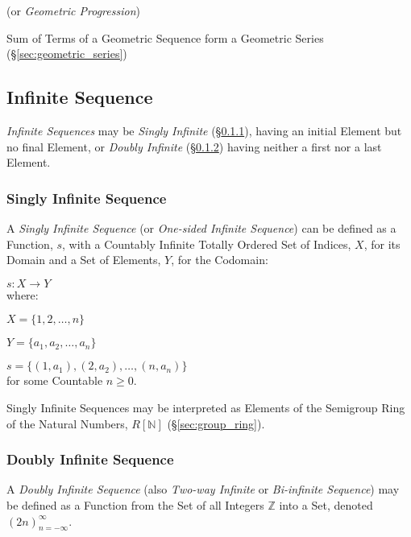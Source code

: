 (or \emph{Geometric Progression})

Sum of Terms of a Geometric Sequence form a Geometric Series
(\S\ref{sec:geometric_series})



\subsection{Infinite Sequence}\label{sec:infinite_sequence}

\emph{Infinite Sequences} may be \emph{Singly Infinite}
(\S\ref{sec:singly_infinite}), having an initial Element but no final
Element, or \emph{Doubly Infinite} (\S\ref{sec:doubly_infinite})
having neither a first nor a last Element.



\subsubsection{Singly Infinite Sequence}\label{sec:singly_infinite}

A \emph{Singly Infinite Sequence} (or \emph{One-sided Infinite
  Sequence}) can be defined as a Function, $s$, with a Countably
Infinite Totally Ordered Set of Indices, $X$, for its Domain and a Set
of Elements, $Y$, for the Codomain:

  $s : X \rightarrow Y$ \\
where:

  $X = \{1,2,\ldots,n\}$

  $Y = \{a_1, a_2,\ldots,a_n\}$

  $s = \{(1,a_1), (2,a_2),\ldots, (n,a_n)\}$ \\
for some Countable $n \geq 0$.

Singly Infinite Sequences may be interpreted as Elements of the
Semigroup Ring of the Natural Numbers, $R[\mathbb{N}]$
(\S\ref{sec:group_ring}).



\subsubsection{Doubly Infinite Sequence}\label{sec:doubly_infinite}

A \emph{Doubly Infinite Sequence} (also \emph{Two-way Infinite} or
\emph{Bi-infinite Sequence}) may be defined as a Function from the Set
of all Integers $\mathbb{Z}$ into a Set, denoted
$(2n)^{\infty}_{n=-\infty}$.

